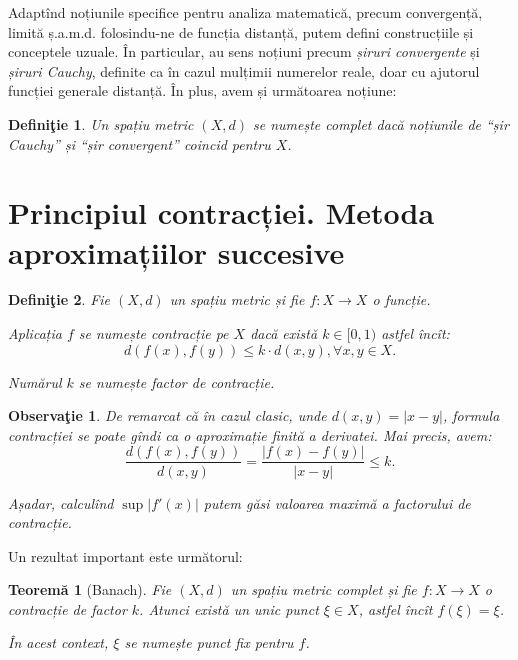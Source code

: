 \documentclass[11pt,a4paper]{article}
\newcommand\qq{\enquote}
\theoremstyle{dotless}
\newtheorem{theorem}{Teorem\u{a}}[section]
\theoremstyle{dotlessdr}
\newtheorem{definition}{Defini\c{t}ie}[section]
\newtheorem{remark}{Observa\c{t}ie}[section]
\begin{document}
Adaptînd noțiunile specifice pentru analiza matematică, precum convergență,
limită ș.a.m.d. folosindu-ne de funcția distanță, putem defini construcțiile
și conceptele uzuale. În particular, au sens noțiuni precum \emph{șiruri convergente}
și \emph{șiruri Cauchy}, definite ca în cazul mulțimii numerelor reale, doar
cu ajutorul funcției generale distanță. În plus, avem și următoarea noțiune:

\begin{definition}\label{def:spatiu-complet}
  Un spațiu metric $(X, d)$ se numește \emph{complet} dacă noțiunile de
  \qq{șir Cauchy} și \qq{șir convergent} coincid pentru $X$.
\end{definition}


\section{Principiul contracției. Metoda aproximațiilor succesive}
\label{sec:contractie}

\begin{definition}\label{def:contractie}
  Fie $(X, d)$ un spațiu metric și fie $f : X \to X$ o funcție.

  Aplicația $f$ se numește \emph{contracție pe $X$} dacă există $k \in [0, 1)$
  astfel încît:
  \[
    d(f(x), f(y)) \leq k \cdot d(x, y), \forall x, y \in X.
  \]

  Numărul $k$ se numește \emph{factor de contracție}.
\end{definition}

\begin{remark}\label{rk:contr-der}
  De remarcat că în cazul clasic, unde $d(x, y) = |x - y|$, formula contracției
  se poate gîndi ca o aproximație finită a derivatei. Mai precis, avem:
  \[
    \frac{d(f(x), f(y))}{d(x, y)} = \frac{|f(x) - f(y)|}{|x - y|} \leq k.
  \]

  Așadar, calculînd $\sup |f'(x)|$ putem găsi valoarea maximă a factorului
  de contracție.
\end{remark}

Un rezultat important este următorul:

\begin{theorem}[Banach]\label{thm:banach-fix}
  Fie $(X, d)$ un spațiu metric complet și fie $f : X \to X$ o contracție de factor
  $k$. Atunci există un unic punct $\xi \in X$, astfel încît $f(\xi) = \xi$.

  În acest context, $\xi$ se numește \emph{punct fix} pentru $f$.
\end{theorem}
\end{document}
